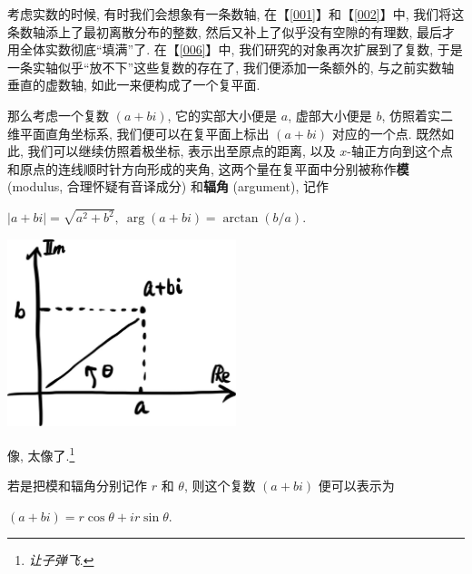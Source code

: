 \begin{tcolorbox}[size=fbox, breakable, enhanced jigsaw, title={复平面 (complex
plane)}]

考虑实数的时候, 有时我们会想象有一条数轴, 在【\ref{001}】和【\ref{002}】中,
我们将这条数轴添上了最初离散分布的整数,
然后又补上了似乎没有空隙的有理数, 最后才用全体实数彻底``填满''了.
在【\ref{006}】中, 我们研究的对象再次扩展到了复数,
于是一条实轴似乎``放不下''这些复数的存在了, 我们便添加一条额外的,
与之前实数轴垂直的虚数轴, 如此一来便构成了一个复平面.

那么考虑一个复数 $(a+bi)$, 它的实部大小便是 $a$, 虚部大小便是 $b$,
仿照着实二维平面直角坐标系, 我们便可以在复平面上标出 $(a+bi)$
对应的一个点. 既然如此, 我们可以继续仿照着极坐标, 表示出至原点的距离,
以及 $x$-轴正方向到这个点和原点的连线顺时针方向形成的夹角,
这两个量在复平面中分别被称作\textbf{模} (modulus, 合理怀疑有音译成分)
和\textbf{辐角} (argument), 记作

$ | a+bi|=\sqrt{a^2+b^2},~\arg(a+bi)=\arctan (b/a).$

\begin{tcolorbox}[size=fbox, breakable, enhanced jigsaw]
\includegraphics[width=0.5\textwidth]{img/image-20230418112740537.png}

\end{tcolorbox}

\begin{newquote}
像, 太像了.\footnote{\emph{让子弹飞}.}
\end{newquote}

若是把模和辐角分别记作 $r$ 和 $\theta$, 则这个复数 $(a+bi)$
便可以表示为

$(a+bi)=r\cos\theta+ir\sin\theta.$

\end{tcolorbox}

